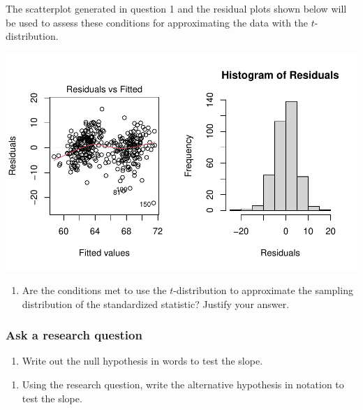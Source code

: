 \documentclass[
]{report}
\providecommand{\tightlist}{%
  \setlength{\itemsep}{0pt}\setlength{\parskip}{0pt}}
\begin{document}
\newpage

The scatterplot generated in question 1 and the residual plots shown below will be used to assess these conditions for approximating the data with the \(t\)-distribution.

\begin{center}\includegraphics[width=0.7\linewidth]{13-A11-regression-theory_files/figure-latex/unnamed-chunk-3-1} \end{center}

\begin{enumerate}
\def\labelenumi{\arabic{enumi}.}
\setcounter{enumi}{1}
\tightlist
\item
  Are the conditions met to use the \(t\)-distribution to approximate the sampling distribution of the standardized statistic? Justify your answer.
\end{enumerate}

\vspace{1.5in}

\hypertarget{ask-a-research-question-5}{%
\subsubsection*{Ask a research question}\label{ask-a-research-question-5}}

\begin{enumerate}
\def\labelenumi{\arabic{enumi}.}
\setcounter{enumi}{2}
\tightlist
\item
  Write out the null hypothesis in words to test the slope.
\end{enumerate}

\vspace{1in}

\begin{enumerate}
\def\labelenumi{\arabic{enumi}.}
\setcounter{enumi}{3}
\tightlist
\item
  Using the research question, write the alternative hypothesis in notation to test the slope.
\end{enumerate}
\end{document}
